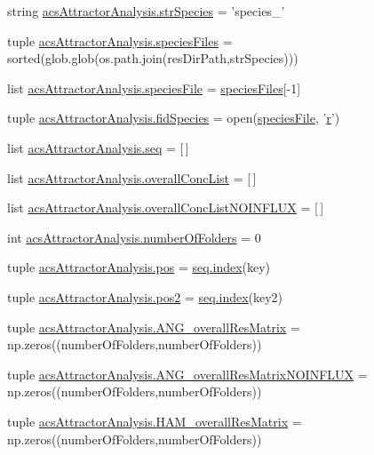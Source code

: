 \begin{DoxyCompactItemize}
\item 
string \hyperlink{a00122_aa76707ba3058ba96fc8e5aeafa461193}{acs\-Attractor\-Analysis.\-str\-Species} = 'species\-\_\-'
\item 
tuple \hyperlink{a00122_a670249d163388a9d93c8f3b9fb63afac}{acs\-Attractor\-Analysis.\-species\-Files} = sorted(glob.\-glob(os.\-path.\-join(res\-Dir\-Path,str\-Species)))
\item 
list \hyperlink{a00122_a0e036b776f4f724254115c2e284657eb}{acs\-Attractor\-Analysis.\-species\-File} = \hyperlink{a00028_af5703745c2c2a6af7f62da460994d9c2}{species\-Files}\mbox{[}-\/1\mbox{]}
\item 
tuple \hyperlink{a00122_a604c9f75892d8d8aeac8306c94630a23}{acs\-Attractor\-Analysis.\-fid\-Species} = open(\hyperlink{a00027_a7da0c82834970c5f3c3d9224ab832577}{species\-File}, '\hyperlink{a00031_ac862e7284527eb913b1351c8bfb8e079}{r}')
\item 
list \hyperlink{a00122_a33bc0e3fc99bab3df33d3f1626a19528}{acs\-Attractor\-Analysis.\-seq} = \mbox{[}$\,$\mbox{]}
\item 
list \hyperlink{a00122_aca1d14f4dbff06c02b0e3e362c7ffe14}{acs\-Attractor\-Analysis.\-overall\-Conc\-List} = \mbox{[}$\,$\mbox{]}
\item 
list \hyperlink{a00122_a62444c9b0d66deb07c2e1091695e7561}{acs\-Attractor\-Analysis.\-overall\-Conc\-List\-N\-O\-I\-N\-F\-L\-U\-X} = \mbox{[}$\,$\mbox{]}
\item 
int \hyperlink{a00122_aa5d2495d08b8ad5ebf34f85d5417e93c}{acs\-Attractor\-Analysis.\-number\-Of\-Folders} = 0
\item 
tuple \hyperlink{a00122_abae060beb170fe923fc10b75f9e82079}{acs\-Attractor\-Analysis.\-pos} = \hyperlink{a00102_a0cd6a44ffb07342cbc7e5ac33bfc9495}{seq.\-index}(key)
\item 
tuple \hyperlink{a00122_a6ab79d8205f5d0ae2da47fb0af93149a}{acs\-Attractor\-Analysis.\-pos2} = \hyperlink{a00102_a0cd6a44ffb07342cbc7e5ac33bfc9495}{seq.\-index}(key2)
\item 
tuple \hyperlink{a00122_a43a783e7bdb1094aa477c438bd67259f}{acs\-Attractor\-Analysis.\-A\-N\-G\-\_\-overall\-Res\-Matrix} = np.\-zeros((number\-Of\-Folders,number\-Of\-Folders))
\item 
tuple \hyperlink{a00122_a0d0e0ed8583e4aa041fa6c122324311e}{acs\-Attractor\-Analysis.\-A\-N\-G\-\_\-overall\-Res\-Matrix\-N\-O\-I\-N\-F\-L\-U\-X} = np.\-zeros((number\-Of\-Folders,number\-Of\-Folders))
\item 
tuple \hyperlink{a00122_a46dc8cdfb545b64952370e51ff02336f}{acs\-Attractor\-Analysis.\-H\-A\-M\-\_\-overall\-Res\-Matrix} = np.\-zeros((number\-Of\-Folders,number\-Of\-Folders))

\end{DoxyCompactItemize}
